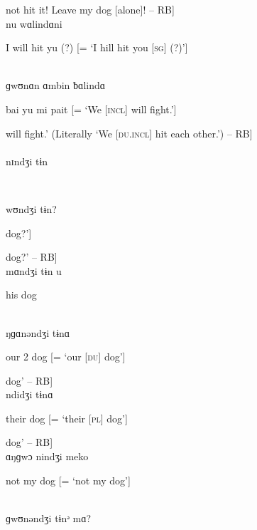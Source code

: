\noindent [‘Do [\textsc{sg}] not hit it! Leave my dog [alone]! -- RB]\\

\noindent nu wɑlindɑni

\noindent I will hit yu (?) [= ‘I hill hit you [\textsc{sg}] (?)’]

\\

\noindent ɡwʊnɑn ɑmbin ƀɑlindɑ

\noindent bai yu mi pait [= ‘We [\textsc{incl]} will fight.’]

\noindent [‘We [\textsc{du.incl}] will fight.’ (Literally ‘We [\textsc{du.incl}] hit each other.’) -- RB]\\

\\

\noindent nɪndʒi tɨn

\noindent [‘my dog’]

\noindent [‘my dog’ -- RB]\\

\newpage

\noindent wʊndʒi tɨn?

\noindent [‘your [\textsc{sg}] dog?’]

\noindent [‘your [\textsc{sg}] dog?’ -- RB]\\

\noindent mɑndʒi tɨn u

\noindent his dog

\\

\noindent ŋɡɑnəndʒi tɨnɑ

\noindent our 2 dog [= ‘our [\textsc{du}] dog’]

\noindent [‘our [\textsc{du.excl}] dog’ -- RB]\\

\noindent ndidʒi tɨnɑ

\noindent their dog [= ‘their [\textsc{pl}] dog’]

\noindent [‘their [\textsc{pl}] dog’ -- RB]\\

\noindent ɑŋɡwɔ nindʒi meko

\noindent not my dog [= ‘not my dog’]

\\

\noindent ɡwʊnəndʒi tɨnᵊ mɑ?

